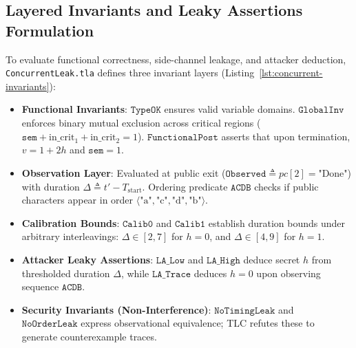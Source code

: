 \documentclass[a4paper,12pt]{report}
\begin{document}
\subsection{Layered Invariants and Leaky Assertions Formulation}
To evaluate functional correctness, side-channel leakage, and attacker deduction, \texttt{ConcurrentLeak.tla} defines three invariant layers (Listing~\ref{lst:concurrent-invariants}):
\begin{itemize}[itemsep=0.05em, topsep=0.04em]
    \item \textbf{Functional Invariants}: $\texttt{TypeOK}$ ensures valid variable domains. $\texttt{GlobalInv}$ enforces binary mutual exclusion across critical regions ($\texttt{sem} + \text{in\_crit}_1 + \text{in\_crit}_2 = 1$). $\texttt{FunctionalPost}$ asserts that upon termination, $v = 1 + 2h$ and $\texttt{sem} = 1$.
    \item \textbf{Observation Layer}: Evaluated at public exit ($\texttt{Observed} \triangleq pc[2] = \text{"Done"}$) with duration $\Delta \triangleq t' - T_{\text{start}}$. Ordering predicate $\texttt{ACDB}$ checks if public characters appear in order $\langle \text{"a"}, \text{"c"}, \text{"d"}, \text{"b"} \rangle$.
    \item \textbf{Calibration Bounds}: $\texttt{Calib0}$ and $\texttt{Calib1}$ establish duration bounds under arbitrary interleavings: $\Delta \in [2, 7]$ for $h = 0$, and $\Delta \in [4, 9]$ for $h = 1$.
    \item \textbf{Attacker Leaky Assertions}: $\texttt{LA\_Low}$ and $\texttt{LA\_High}$ deduce secret $h$ from thresholded duration $\Delta$, while $\texttt{LA\_Trace}$ deduces $h = 0$ upon observing sequence $\texttt{ACDB}$.
    \item \textbf{Security Invariants (Non-Interference)}: $\texttt{NoTimingLeak}$ and $\texttt{NoOrderLeak}$ express observational equivalence; TLC refutes these to generate counterexample traces.
\end{itemize}
\end{document}
